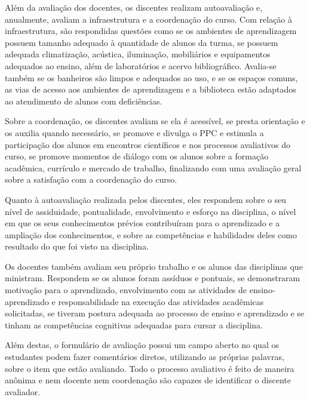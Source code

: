 Além da avaliação dos docentes, os discentes realizam autoavaliação e, anualmente, avaliam a infraestrutura e a coordenação do curso. Com relação à infraestrutura, são respondidas questões como se os ambientes de aprendizagem possuem tamanho adequado à quantidade de alunos da turma, se possuem adequada climatização, acústica, iluminação, mobiliários e equipamentos adequados ao ensino, além de laboratórios e acervo bibliográfico. Avalia-se também se os banheiros são limpos e adequados ao uso, e se os espaços comuns, as vias de acesso aos ambientes de aprendizagem e a biblioteca estão adaptados ao atendimento de alunos com deficiências.

Sobre a coordenação, os discentes avaliam se ela é acessível, se presta orientação e os auxilia quando necessário, se promove e divulga o PPC e estimula a participação dos alunos em encontros científicos e nos processos avaliativos do curso, se promove momentos de diálogo com os alunos sobre a formação acadêmica, currículo e mercado de trabalho, finalizando com uma avaliação geral sobre a satisfação com a coordenação do curso.

Quanto à autoavaliação realizada pelos discentes, eles respondem sobre o seu nível de assiduidade, pontualidade, envolvimento e esforço na disciplina, o nível em que os seus conhecimentos prévios contribuíram para o aprendizado e a ampliação dos conhecimentos, e sobre as competências e habilidades deles como resultado do que foi visto na disciplina.

Os docentes também avaliam seu próprio trabalho e os alunos das disciplinas que ministram. Respondem se os alunos foram assíduos e pontuais, se demonstraram motivação para o aprendizado, envolvimento com as atividades de ensino-aprendizado e responsabilidade na execução das atividades acadêmicas solicitadas, se tiveram postura adequada ao processo de ensino e aprendizado e se tinham as competências cognitivas adequadas para cursar a disciplina.

Além destas, o formulário de avaliação possui um campo aberto no qual os estudantes podem fazer comentários diretos, utilizando as próprias palavras, sobre o item que estão avaliando. Todo o processo avaliativo é feito de maneira anônima e nem docente nem coordenação são capazes de identificar o discente avaliador.